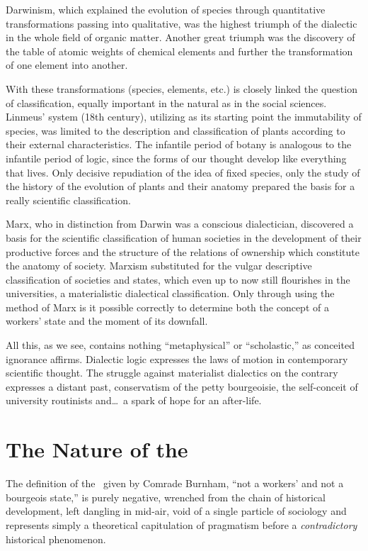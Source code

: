Darwinism, which explained the evolution of species through quantitative transformations passing into qualitative, was the highest triumph of the dialectic in the whole field of organic matter. Another great triumph was the discovery of the table of atomic weights of chemical elements and further the transformation of one element into another.

With these transformations (species, elements, etc.) is closely linked the question of classification, equally important in the natural as in the social sciences. Linmeus’ system (18th century), utilizing as its starting point the immutability of species, was limited to the description and classification of plants according to their external characteristics. The infantile period of botany is analogous to the infantile period of logic, since the forms of our thought develop like everything that lives. Only decisive repudiation of the idea of fixed species, only the study of the history of the evolution of plants and their anatomy prepared the basis for a really scientific classification.

Marx, who in distinction from Darwin was a conscious dialectician, discovered a basis for the scientific classification of human societies in the development of their productive forces and the structure of the relations of ownership which constitute the anatomy of society. Marxism substituted for the vulgar descriptive classification of societies and states, which even up to now still flourishes in the universities, a materialistic dialectical classification. Only through using the method of Marx is it possible correctly to determine both the concept of a workers’ state and the moment of its downfall.

All this, as we see, contains nothing “metaphysical” or “scholastic,” as conceited ignorance affirms. Dialectic logic expresses the laws of motion in contemporary scientific thought. The struggle against materialist dialectics on the contrary expresses a distant past, conservatism of the petty bourgeoisie, the self-conceit of university routinists and\dots\ a spark of hope for an after-life.

\section*{The Nature of the \USSR}

The definition of the \USSR\ given by Comrade Burnham, “not a workers’ and not a bourgeois state,” is purely negative, wrenched from the chain of historical development, left dangling in mid-air, void of a single particle of sociology and represents simply a theoretical capitulation of pragmatism before a \emph{contradictory} historical phenomenon.

